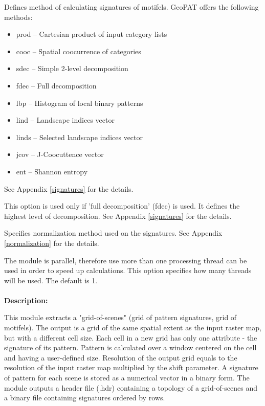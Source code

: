
Defines method of calculating signatures of motifels. GeoPAT offers the following methods: 
\begin{itemize}
	\item prod -- Cartesian product of input category lists
	\item cooc -- Spatial coocurrence of categories
	\item sdec -- Simple 2-level decomposition
	\item fdec -- Full decomposition
	\item lbp -- Histogram of local binary patterns
	\item lind -- Landscape indices vector
	\item linds -- Selected landscape indices vector
	\item jcov -- J-Coocuttence vector
	\item ent -- Shannon entropy
\end{itemize}
See Appendix \ref{signatures} for the details.


This option is used only if 'full decomposition' (fdec) is used.
It defines the highest level of decomposition. See Appendix \ref{signatures} for the details.


Specifies normalization method used on the signatures. 
See Appendix \ref{normalization} for the details.


The module is parallel, therefore use more than one processing thread can be used in order to speed up calculations. 
This option specifies how many threads will be used. 
The default is 1.
\\\\

{\bf Description:}

This module extracts a "grid-of-scenes" (grid of pattern signatures, grid of motifels).
The output is a grid of the same spatial extent as the input raster map, but with a different cell size.
Each cell in a new grid has only one attribute - the signature of its pattern. 
Pattern is calculated over a window centered on the cell and having a user-defined size.
Resolution of the output grid equals to the resolution of the input raster map multiplied by the shift parameter. 
A signature of pattern for each scene is stored as a numerical vector in a binary form.
The module outputs a header file (.hdr) containing a topology of a grid-of-scenes and a binary file containing signatures ordered by rows.

